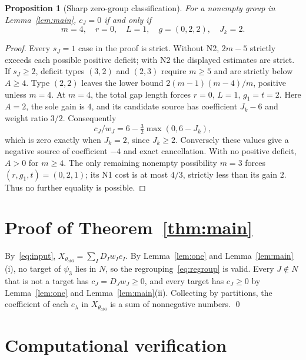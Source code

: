 \documentclass[11pt]{article}
\newtheorem{proposition}{Proposition}
\theoremstyle{remark}
\theoremstyle{definition}
\begin{document}
\begin{proposition}[Sharp zero-group classification]\label{prop:equality}
For a nonempty group in Lemma~\ref{lem:main}, $c_J=0$ if and only if
\[
m=4,\quad r=0,\quad L=1,\quad g=(0,2,2),\quad J_k=2.
\]
\end{proposition}
\begin{proof}
Every $s_J=1$ case in the proof is strict. Without N2, $2m-5$ strictly exceeds each possible positive deficit; with N2 the displayed estimates are strict. If $s_J\ge2$, deficit types $(3,2)$ and $(2,3)$ require $m\ge5$ and are strictly below $A\ge4$. Type $(2,2)$ leaves the lower bound $2(m-1)(m-4)/m$, positive unless $m=4$. At $m=4$, the total gap length forces $r=0$, $L=1$, $g_1=t=2$. Here $A=2$, the sole gain is $4$, and its candidate source has coefficient $J_k-6$ and weight ratio $3/2$. Consequently
\[
c_J/w_J=6-\tfrac32\max(0,6-J_k),
\]
which is zero exactly when $J_k=2$, since $J_k\ge2$. Conversely these values give a negative source of coefficient $-4$ and exact cancellation.
With no positive deficit, $A>0$ for $m\ge4$. The only remaining nonempty possibility $m=3$ forces $(r,g_1,t)=(0,2,1)$; its N1 cost is at most $4/3$, strictly less than its gain $2$. Thus no further equality is possible.
\end{proof}

\section{Proof of Theorem~\ref{thm:main}}

By~\eqref{eq:input}, $X_{\theta_{ab3}}=\sum_ID_Iw_Ie_I$. By Lemma~\ref{lem:one} and Lemma~\ref{lem:main}(i), no target of $\psi_3$ lies in $N$, so the regrouping~\eqref{eq:regroup} is valid. Every $J\notin N$ that is not a target has $c_J=D_Jw_J\ge0$, and every target has $c_J\ge0$ by Lemma~\ref{lem:one} and Lemma~\ref{lem:main}(ii). Collecting by partitions, the coefficient of each $e_\lambda$ in $X_{\theta_{ab3}}$ is a sum of nonnegative numbers. \qed

\section{Computational verification}\label{sec:comp}
\end{document}
